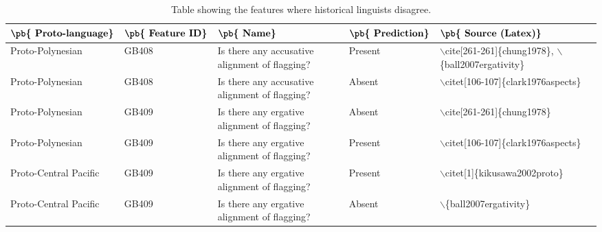 \begin{table}[ht]
\centering
\begin{tabular}{p{4cm}p{4cm}p{4cm}p{4cm}p{4cm}}
  \toprule
$\textbf{\pb{ Proto-language}}$ & $\textbf{\pb{ Feature ID}}$ & $\textbf{\pb{ Name}}$ & $\textbf{\pb{ Prediction}}$ & $\textbf{\pb{ Source (Latex)}}$ \\ 
  \midrule
Proto-Polynesian & GB408 & Is there any accusative alignment of flagging? & Present & $\backslash$cite[261-261]\{chung1978\}, $\backslash$\{ball2007ergativity\} \\ 
  Proto-Polynesian & GB408 & Is there any accusative alignment of flagging? & Absent & $\backslash$citet[106-107]\{clark1976aspects\} \\ 
  Proto-Polynesian & GB409 & Is there any ergative alignment of flagging? & Absent & $\backslash$cite[261-261]\{chung1978\} \\ 
  Proto-Polynesian & GB409 & Is there any ergative alignment of flagging? & Present & $\backslash$citet[106-107]\{clark1976aspects\} \\ 
  Proto-Central Pacific & GB409 & Is there any ergative alignment of flagging? & Present & $\backslash$citet[1]\{kikusawa2002proto\} \\ 
  Proto-Central Pacific & GB409 & Is there any ergative alignment of flagging? & Absent & $\backslash$\{ball2007ergativity\} \\ 
   \bottomrule
\end{tabular}
\caption{Table showing the features where historical linguists disagree.} 
\label{conflict_table}
\end{table}
